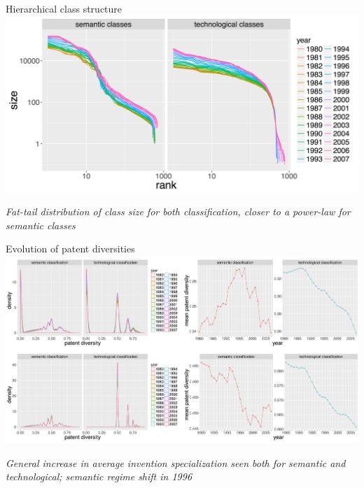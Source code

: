 \documentclass{beamer}
\begin{document}
\begin{frame}{Hierarchical class structure}
   \centering
    \includegraphics[width=\textwidth]{figures/Fig4.png}
    
    \medskip

    \textit{Fat-tail distribution of class size for both classification, closer to a power-law for semantic classes}
    
\end{frame}

\begin{frame}{Evolution of patent diversities}
   \centering
    \includegraphics[width=\textwidth]{figures/Fig5.png}
    
    \medskip

    \textit{General increase in average invention specialization seen both for semantic and technological; semantic regime shift in 1996} 
    
\end{frame}
\end{document}
